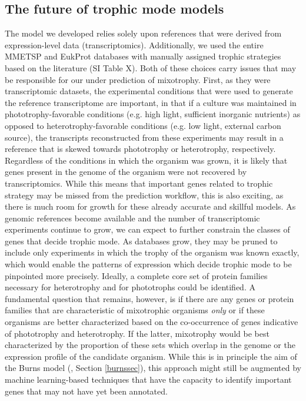 \documentclass[12pt]{article}
\numberwithin{equation}{section}
\begin{document}
\subsection{The future of trophic mode models}\label{limitations}
The model we developed relies solely upon references that were derived from expression-level data (transcriptomics). Additionally, we used the entire MMETSP \citep{Keeling2014} and EukProt \citep{Richter2020EukProt} databases with manually assigned trophic strategies based on the literature (SI Table X). Both of these choices carry issues that may be responsible for our under prediction of mixotrophy. First, as they were transcriptomic datasets, the experimental conditions that were used to generate the reference transcriptome are important, in that if a culture was maintained in phototrophy-favorable conditions (e.g. high light, sufficient inorganic nutrients) as opposed to heterotrophy-favorable conditions (e.g. low light, external carbon source), the transcripts reconstructed from these experiments  may result in a reference that is skewed towards phototrophy or heterotrophy, respectively. Regardless of the conditions in which the organism was grown, it is likely that genes present in the genome of the organism were not recovered by transcriptomics. While this means that important genes related to trophic strategy may be missed from the prediction workflow, this is also exciting, as there is much room for growth for these already accurate and skillful models. As genomic references become available and the number of transcriptomic experiments continue to grow, we can expect to further constrain the classes of genes that decide trophic mode. As databases grow, they may be pruned to include only experiments in which the trophy of the organism was known exactly, which would enable the patterns of expression which decide trophic mode to be  pinpointed more precisely. Ideally, a complete core set of protein families necessary for heterotrophy and for phototrophs could be identified. A fundamental question that remains, however, is if there are any genes or protein families that are characteristic of mixotrophic organisms \textit{only} or if these organisms are better characterized based on the co-occurrence of genes indicative of phototrophy and heterotrophy. If the latter,  mixotrophy would be best characterized by the proportion of these sets which overlap in the genome or the expression profile of the candidate organism. While this is in principle the aim of the Burns model (\cite{burns2018gene}, Section \ref{burnssec}), this approach might still  be augmented by machine learning-based techniques that have the capacity to identify important genes that may not have yet been annotated. 
\end{document}
